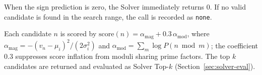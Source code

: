 When the sign prediction is zero, the Solver immediately returns 0. If no valid candidate is
found in the search range, the call is recorded as \texttt{none}.

Each candidate $n$ is scored by $\text{score}(n) = \alpha_{\text{mag}} + 0.3\,\alpha_{\text{mod}}$,
where $\alpha_{\text{mag}} = -(v_n-\mu_i)^2/(2\sigma_i^2)$ and
$\alpha_{\text{mod}} = \sum_{m}\log P(n\bmod m)$;
the coefficient 0.3 suppresses score inflation from moduli sharing prime factors.
The top $k$ candidates are returned and evaluated as Solver Top-$k$ (Section~\ref{sec:solver-eval}).

